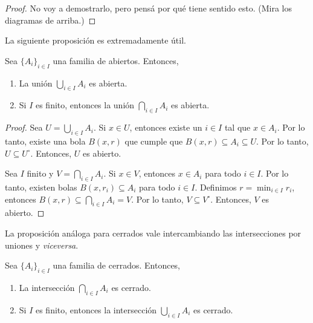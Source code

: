 \begin{proof}
	No voy a demostrarlo, pero pensá por qué tiene sentido esto. (Mira los diagramas de arriba.)
\end{proof}

La siguiente proposición es extremadamente útil.

\begin{proposition}
	Sea $\{ A_i \}_{i \in I}$ una familia de abiertos. Entonces,
	\begin{enumerate}
		\item La unión $\bigcup_{i \in I} A_i$ es abierta.
		\item Si $I$ es finito, entonces la unión $\bigcap_{i \in I} A_i$ es abierta.
	\end{enumerate}
\end{proposition}

\begin{proof}
	 Sea $U = \bigcup_{i \in I} A_i$. Si $x \in U$, entonces existe un $i \in I$ tal que $x \in A_i$. Por lo tanto, existe una bola $B(x, r)$ que cumple que $B(x, r) \subseteq A_i \subseteq U$. Por lo tanto, $U \subseteq U^{\circ}$. Entonces, $U$ es abierto.

	 Sea $I$ finito y $V = \bigcap_{i \in I} A_i$. Si $x \in V$, entonces $x \in A_i$ para todo $i \in I$. Por lo tanto, existen bolas $B(x, r_i) \subseteq A_i$ para todo $i \in I$. Definimos $r = \min_{i \in I} r_i$, entonces $B(x, r) \subseteq \bigcap_{i \in I} A_i = V$. Por lo tanto, $V \subseteq V^{\circ}$. Entonces, $V$ es abierto.
\end{proof}

La proposición análoga para cerrados vale intercambiando las intersecciones por uniones y \textit{viceversa}.

\begin{proposition}
	Sea $\{ A_i \}_{i \in I}$ una familia de cerrados. Entonces,
	\begin{enumerate}
		\item La intersección $\bigcap_{i \in I} A_i$ es cerrado.
		\item Si $I$ es finito, entonces la intersección $\bigcup_{i \in I} A_i$ es cerrado.
	\end{enumerate}
\end{proposition}

